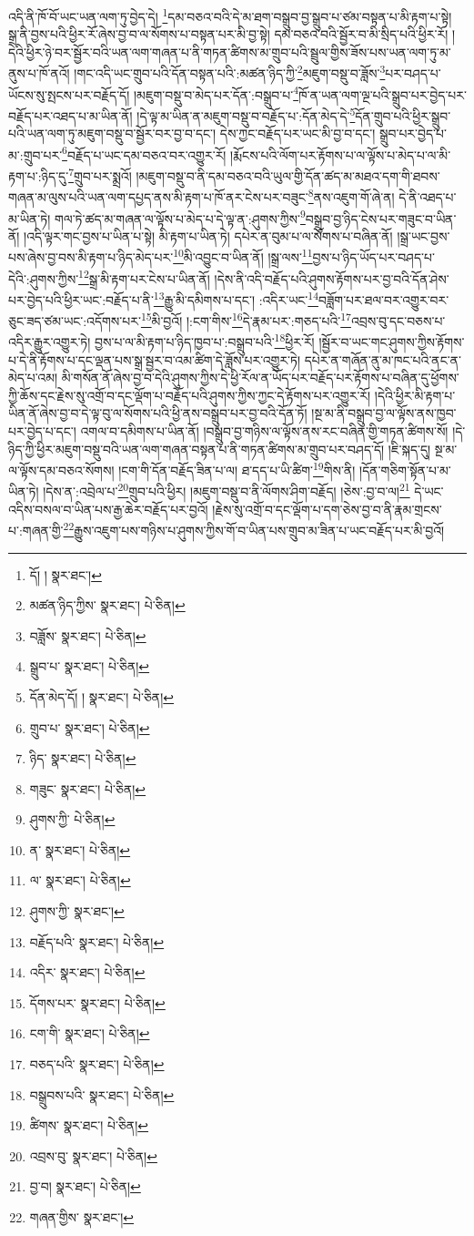འདི་ནི་ཁོ་བོ་ཡང་ཡན་ལག་ཏུ་བྱེད་དེ། \footnote{དོ། །   སྣར་ཐང་། }དམ་བཅའ་བའི་དེ་མ་ཐག་བསྒྲུབ་བྱ་སྒྲུབ་པ་ཙམ་བསྟན་པ་མི་རྟག་པ་སྟེ། སྒྲ་ནི་བྱས་པའི་ཕྱིར་རོ་ཞེས་བྱ་བ་ལ་སོགས་པ་བསྟན་པར་མི་བྱ་སྟེ། དམ་བཅའ་བའི་སྦྱོར་བ་མི་སྲིད་པའི་ཕྱིར་རོ། །དེའི་ཕྱིར་ཉེ་བར་སྦྱོར་བའི་ཡན་ལག་གཞན་པ་ནི་གཏན་ཚིགས་མ་གྲུབ་པའི་སྦྲུལ་གྱིས་ཟོས་པས་ཡན་ལག་ཏུ་མ་ནུས་པ་ཁོ་ནའོ། །གང་འདི་ཡང་གྲུབ་པའི་དོན་བསྟན་པའི་:མཚན་ཉིད་ཀྱི་\footnote{མཚན་ཉིད་ཀྱིས་  སྣར་ཐང་།  པེ་ཅིན། }མཇུག་བསྡུ་བ་ཟློས་\footnote{བཟློས་  སྣར་ཐང་།  པེ་ཅིན། }པར་བཤད་པ་ཡོངས་སུ་སྤངས་པར་བརྗོད་དོ། །མཇུག་བསྡུ་བ་མེད་པར་དོན་:བསྒྲུབ་པ་\footnote{སྒྲུབ་པ་  སྣར་ཐང་།  པེ་ཅིན། }ཁོ་ན་ཡན་ལག་ལྔ་པའི་སྒྲུབ་པར་བྱེད་པར་བརྗོད་པར་འཐད་པ་མ་ཡིན་ནོ། །དེ་ལྟ་མ་ཡིན་ན་མཇུག་བསྡུ་བ་བརྗོད་པ་:དོན་མེད་དེ་\footnote{དོན་མེད་དོ། །  སྣར་ཐང་།  པེ་ཅིན། }དོན་གྲུབ་པའི་ཕྱིར་སྒྲུབ་པའི་ཡན་ལག་ཏུ་མཇུག་བསྡུ་བ་སྦྱོར་བར་བྱ་བ་དང་། དེས་ཀྱང་བརྗོད་པར་ཡང་མི་བྱ་བ་དང་། སྒྲུབ་པར་བྱེད་པ་མ་:གྲུབ་པར་\footnote{གྲུབ་པ་  སྣར་ཐང་།  པེ་ཅིན། }བརྗོད་པ་ཡང་དམ་བཅའ་བར་འགྱུར་རོ། །རྨོངས་པའི་ལོག་པར་རྟོགས་པ་ལ་ལྟོས་པ་མེད་པ་ལ་མི་རྟག་པ་:ཉིད་དུ་\footnote{ཉིད་  སྣར་ཐང་།  པེ་ཅིན། }གྲུབ་པར་སྨྲའོ། །མཇུག་བསྡུ་བ་ནི་དམ་བཅའ་བའི་ཡུལ་གྱི་དོན་ཚད་མ་མཐའ་དག་གི་ཐབས་གཞན་མ་ལུས་པའི་ཡན་ལག་དཔྱད་ནས་མི་རྟག་པ་ཁོ་ནར་ངེས་པར་བཟུང་\footnote{གཟུང་  སྣར་ཐང་།  པེ་ཅིན། }ནས་འཇུག་གོ་ཞེ་ན། དེ་ནི་འཐད་པ་མ་ཡིན་ཏེ། གལ་ཏེ་ཚད་མ་གཞན་ལ་ལྟོས་པ་མེད་པ་དེ་ལྟ་ན་:ཤུགས་ཀྱིས་\footnote{ཤུགས་ཀྱི་  པེ་ཅིན། }བསྒྲུབ་བྱ་ཉིད་ངེས་པར་གཟུང་བ་ཡིན་ནོ། །འདི་ལྟར་གང་བྱས་པ་ཡིན་པ་སྟེ། མི་རྟག་པ་ཡིན་ཏེ། དཔེར་ན་བུམ་པ་ལ་སོགས་པ་བཞིན་ནོ། །སྒྲ་ཡང་བྱས་པས་ཞེས་བྱ་བས་མི་རྟག་པ་ཉིད་མེད་པར་\footnote{ན་  སྣར་ཐང་།  པེ་ཅིན། }མི་འབྱུང་བ་ཡིན་ནོ། །སྒྲ་ལས་\footnote{ལ་  སྣར་ཐང་།  པེ་ཅིན། }བྱས་པ་ཉིད་ཡོད་པར་བཤད་པ་དེའི་:ཤུགས་ཀྱིས་\footnote{ཤུགས་ཀྱི་  སྣར་ཐང་། }སྒྲ་མི་རྟག་པར་ངེས་པ་ཡིན་ནོ། །དེས་ནི་འདི་བརྗོད་པའི་ཤུགས་རྟོགས་པར་བྱ་བའི་དོན་ཤེས་པར་བྱེད་པའི་ཕྱིར་ཡང་:བརྗོད་པ་ནི་\footnote{བརྗོད་པའི་  སྣར་ཐང་།  པེ་ཅིན། }རྒྱུ་མི་དམིགས་པ་དང་། :འདིར་ཡང་\footnote{འདིར་  སྣར་ཐང་།  པེ་ཅིན། }བཟློག་པར་ཐལ་བར་འགྱུར་བར་ཅུང་ཟད་ཙམ་ཡང་:འདོགས་པར་\footnote{དོགས་པར་  སྣར་ཐང་།  པེ་ཅིན། }མི་བྱའོ། །:ངག་གིས་\footnote{ངག་གི་  སྣར་ཐང་།  པེ་ཅིན། }དེ་རྣམ་པར་:གཅད་པའི་\footnote{བཅད་པའི་  སྣར་ཐང་།  པེ་ཅིན། }འབྲས་བུ་དང་བཅས་པ་འདིར་རྒྱུར་འགྱུར་ཏེ། བྱས་པ་ལ་མི་རྟག་པ་ཉིད་ཁྱབ་པ་:བསྒྲུབ་པའི་\footnote{བསྒྲུབས་པའི་  སྣར་ཐང་།  པེ་ཅིན། }ཕྱིར་རོ། །སྦྱོར་བ་ཡང་གང་ཤུགས་ཀྱིས་རྟོགས་པ་དེ་ནི་རྟོགས་པ་དང་ལྡན་པས་སྒྲ་སྦྱར་བ་འམ་ཚིག་དེ་ཟློས་པར་འགྱུར་ཏེ། དཔེར་ན་གཞོན་ནུ་མ་ཁང་པའི་ནང་ན་མེད་པ་འམ། མི་གསོན་ནོ་ཞེས་བྱ་བ་དེའི་ཤུགས་ཀྱིས་དེ་ཕྱི་རོལ་ན་ཡོད་པར་བརྗོད་པར་རྟོགས་པ་བཞིན་དུ་ཕྱོགས་ཀྱི་ཆོས་དང་རྗེས་སུ་འགྲོ་བ་དང་ལྡོག་པ་བརྗོད་པའི་ཤུགས་ཀྱིས་ཀྱང་དེ་རྟོགས་པར་འགྱུར་རོ། །དེའི་ཕྱིར་མི་རྟག་པ་ཡིན་ནོ་ཞེས་བྱ་བ་དེ་ལྟ་བུ་ལ་སོགས་པའི་ཕྱི་ནས་བསྒྲུབ་པར་བྱ་བའི་དོན་ཏོ། །སྔ་མ་ནི་བསྒྲུབ་བྱ་ལ་ལྟོས་ནས་ཁྱབ་པར་བྱེད་པ་དང་། འགལ་བ་དམིགས་པ་ཡིན་ནོ། །བསྒྲུབ་བྱ་གཉིས་ལ་ལྟོས་ནས་རང་བཞིན་གྱི་གཏན་ཚིགས་སོ། །དེ་ཉིད་ཀྱི་ཕྱིར་མཇུག་བསྡུ་བའི་ཡན་ལག་གཞན་བསྟན་པ་ནི་གཏན་ཚིགས་མ་གྲུབ་པར་བཤད་དོ། །ཇི་སྐད་དུ། སྔ་མ་ལ་ལྟོས་དམ་བཅའ་སོགས། །ངག་གི་དོན་བརྗོད་ཟིན་པ་ལ། ཐ་དད་པ་ཡི་ཚིག་\footnote{ཚིགས་  སྣར་ཐང་།  པེ་ཅིན། }གིས་ནི། །དོན་གཅིག་སྟོན་པ་མ་ཡིན་ཏེ། །དེས་ན་:འབྲེལ་པ་\footnote{འབྲས་བུ་  སྣར་ཐང་།  པེ་ཅིན། }གྲུབ་པའི་ཕྱིར། །མཇུག་བསྡུ་བ་ནི་ལོགས་ཤིག་བརྗོད། །ཅེས་:བྱ་བ་ལ།\footnote{བྱ་བ།  སྣར་ཐང་།  པེ་ཅིན། } དེ་ཡང་འདིས་བསལ་བ་ཡིན་པས་རྒྱ་ཆེར་བརྗོད་པར་བྱའོ། །རྗེས་སུ་འགྲོ་བ་དང་ལྡོག་པ་དག་ཅེས་བྱ་བ་ནི་རྣམ་གྲངས་པ་:གཞན་གྱི་\footnote{གཞན་གྱིས་  སྣར་ཐང་། }རྒྱུས་འཇུག་པས་གཉིས་པ་ཤུགས་ཀྱིས་གོ་བ་ཡིན་པས་གྲུབ་མ་ཟིན་པ་ཡང་བརྗོད་པར་མི་བྱའོ། 